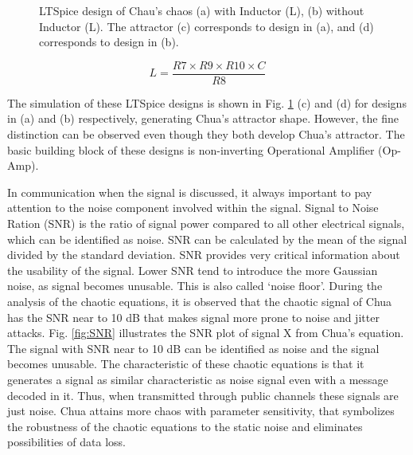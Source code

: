 \begin{figure}[!t]
        \qquad
        \vspace{2pt}
        \caption {LTSpice design of Chau's chaos (a) with Inductor (L), (b) without Inductor (L). The attractor (c) corresponds to design in (a), and (d) corresponds to design in (b).}
        \label{fig:ltspice1}%
    \end{figure}

\begin{equation*}
L = \frac{R7 \times R9 \times R10 \times C}{R8}    
\end{equation*}

The simulation of these LTSpice designs is shown in Fig. \ref{fig:ltspice1} (c) and (d) for designs in (a) and (b) respectively, generating Chua's attractor shape. However, the fine distinction can be observed even though they both develop Chua's attractor. The basic building block of these designs is non-inverting Operational Amplifier (Op-Amp).

In communication when the signal is discussed, it always important to pay attention to the noise component involved within the signal. Signal to Noise Ration (SNR) is the ratio of signal power compared to all other electrical signals, which can be identified as noise. SNR can be calculated by the mean of the signal divided by the standard deviation. SNR provides very critical information about the usability of the signal. Lower SNR tend to introduce the more Gaussian noise, as signal becomes unusable. This is also called `noise floor’. During the analysis of the chaotic equations, it is observed that the chaotic signal of Chua has the SNR near to 10 dB that makes signal more prone to noise and jitter attacks. Fig. \ref{fig:SNR} illustrates the SNR plot of signal X from Chua’s equation. The signal with SNR near to 10 dB can be identified as noise and the signal becomes unusable. The characteristic of these
chaotic equations is that it generates a signal as similar characteristic as noise signal even with
a message decoded in it. Thus, when transmitted through public channels these signals are just noise. Chua attains more chaos with parameter sensitivity, that symbolizes
the robustness of the chaotic equations to the static noise and eliminates possibilities of data loss.


